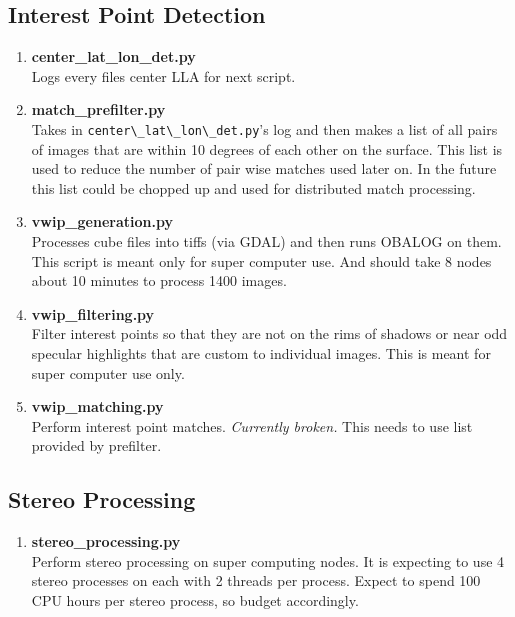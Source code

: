 \documentclass[12pt]{article}
\begin{document}
\subsection*{Interest Point Detection}

\begin{enumerate}

\item \textbf{center\_lat\_lon\_det.py} \hfill \\
  Logs every files center LLA for next script.

\item \textbf{match\_prefilter.py} \hfill \\
  Takes in \verb#center\_lat\_lon\_det.py#'s log and then makes a list of all pairs of images that are within 10 degrees of each other on the surface. This list is used to reduce the number of pair wise matches used later on. In the future this list could be chopped up and used for distributed match processing.

\item \textbf{vwip\_generation.py} \hfill \\
  Processes cube files into tiffs (via GDAL) and then runs OBALOG on them. This script is meant only for super computer use. And should take 8 nodes about 10 minutes to process 1400 images.

\item \textbf{vwip\_filtering.py} \hfill \\
  Filter interest points so that they are not on the rims of shadows or near odd specular highlights that are custom to individual images. This is meant for super computer use only.

\item \textbf{vwip\_matching.py} \hfill \\
  Perform interest point matches. \emph{Currently broken.} This needs to use list provided by prefilter.

\end{enumerate}

\subsection*{Stereo Processing}

\begin{enumerate}

\item \textbf{stereo\_processing.py} \hfill \\
  Perform stereo processing on super computing nodes. It is expecting to use 4 stereo processes on each with 2 threads per process. Expect to spend 100 CPU hours per stereo process, so budget accordingly.

\end{enumerate}
\end{document}
